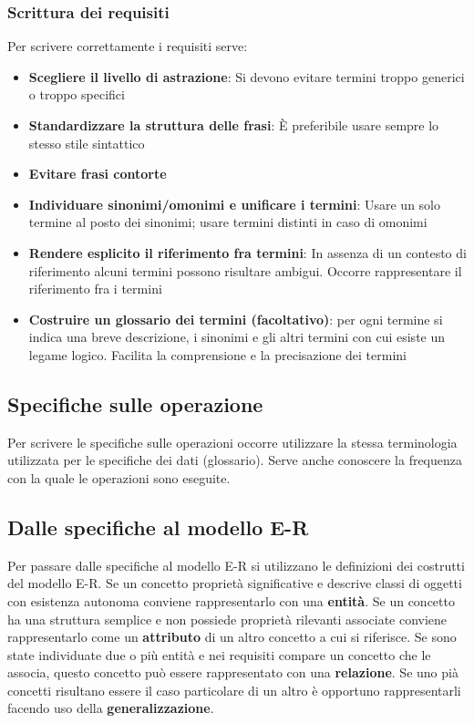 \documentclass[12pt]{article}
\begin{document}
\subsubsection{Scrittura dei requisiti}
Per scrivere correttamente i requisiti serve:
\begin{itemize}
    \item \textbf{Scegliere il livello di astrazione}: Si devono evitare termini troppo generici o troppo specifici
    \item \textbf{Standardizzare la struttura delle frasi}: È preferibile usare sempre lo stesso stile sintattico
    \item \textbf{Evitare frasi contorte}
    \item \textbf{Individuare sinonimi/omonimi e unificare i termini}: Usare un solo termine al posto dei sinonimi; usare termini distinti in caso di omonimi
    \item \textbf{Rendere esplicito il riferimento fra termini}: In assenza di un contesto di riferimento alcuni termini possono risultare ambigui. Occorre rappresentare il riferimento fra i termini
    \item \textbf{Costruire un glossario dei termini (facoltativo)}: per ogni termine si indica una breve descrizione, i sinonimi e gli altri termini con cui esiste un legame logico. Facilita la comprensione e la precisazione dei termini
\end{itemize}
\subsection{Specifiche sulle operazione}
Per scrivere le specifiche sulle operazioni occorre utilizzare la stessa terminologia utilizzata per le specifiche dei dati (glossario).
Serve anche conoscere la frequenza con la quale le operazioni sono eseguite.
\subsection{Dalle specifiche al modello E-R}
Per passare dalle specifiche al modello E-R si utilizzano le definizioni dei costrutti del modello E-R.
Se un concetto proprietà significative e descrive classi di oggetti con esistenza autonoma conviene rappresentarlo con una \textbf{entità}.
Se un concetto ha una struttura semplice e non possiede proprietà rilevanti associate conviene rappresentarlo come un \textbf{attributo} di un altro concetto a cui si riferisce.
Se sono state individuate due o più entità e nei requisiti compare un concetto che le associa, questo concetto può essere rappresentato con una \textbf{relazione}.
Se uno pià concetti risultano essere il caso particolare di un altro è opportuno rappresentarli facendo uso della \textbf{generalizzazione}.
\end{document}
